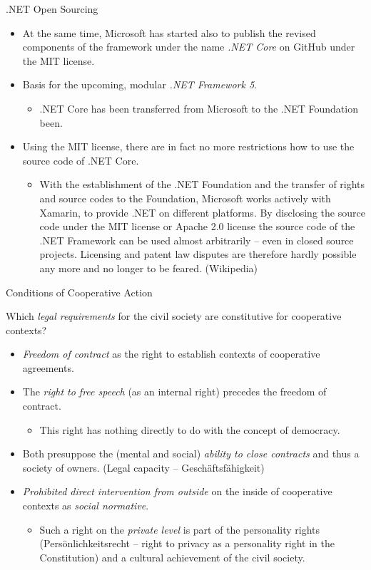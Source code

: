 \documentclass{beamer}
\begin{document}
\begin{frame}{.NET Open Sourcing}
\begin{itemize}
\item At the same time, Microsoft has started also to publish the revised
  components of the framework under the name \emph{.NET Core} on GitHub under
  the MIT license.
\item Basis for the upcoming, modular \emph{.NET Framework 5}.
  \begin{itemize}
  \item .NET Core has been transferred from Microsoft to the .NET Foundation
    been.
  \end{itemize}
\item Using the MIT license, there are in fact no more restrictions how to use
  the source code of .NET Core.
  \begin{itemize}
  \item With the establishment of the .NET Foundation and the transfer of
    rights and source codes to the Foundation, Microsoft works actively with
    Xamarin, to provide .NET on different platforms. By disclosing the source
    code under the MIT license or Apache 2.0 license the source code of the
    .NET Framework can be used almost arbitrarily -- even in closed source
    projects. Licensing and patent law disputes are therefore hardly possible
    any more and no longer to be feared. (Wikipedia)
  \end{itemize}
\end{itemize}
\end{frame}

\begin{frame}{Conditions of Cooperative Action}
  
Which \emph{legal requirements} for the civil society are constitutive for
cooperative contexts?\vspace{-1em}
\begin{itemize}
\item \emph{Freedom of contract} as the right to establish contexts of
  cooperative agreements.
\item The \emph{right to free speech} (as an internal right) precedes the
  freedom of contract.
  \begin{itemize}
  \item This right has nothing directly to do with the concept of democracy.
  \end{itemize}
\item Both presuppose the (mental and social) \emph{ability to close
  contracts} and thus a society of owners. (Legal capacity --
  Geschäftsfähigkeit) 
\item \emph{Prohibited direct intervention from outside} on the inside of
  cooperative contexts as \emph{social normative}.
  \begin{itemize}
  \item Such a right on the \emph{private level} is part of the personality
    rights (Persönlichkeitsrecht -- right to privacy as a personality right in
    the Constitution) and a cultural achievement of the civil society.
  \end{itemize}
\end{itemize}
\end{frame}
\end{document}
